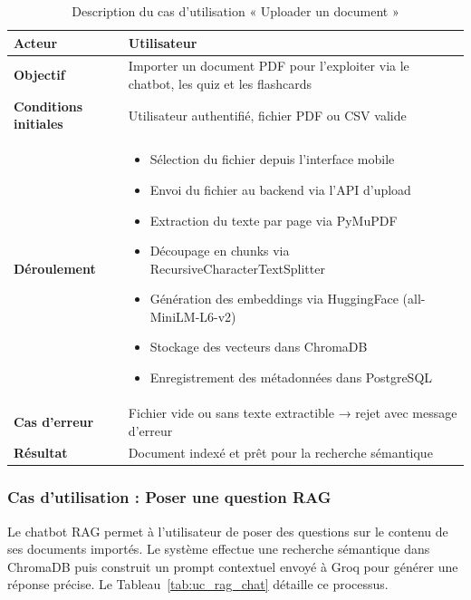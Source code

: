 \begin{table}[H]
\centering
\renewcommand{\arraystretch}{1.2}
\begin{tabular}{|p{4cm}|p{10cm}|}
\hline
\textbf{Acteur} & Utilisateur \\ \hline

\textbf{Objectif} & Importer un document PDF pour l'exploiter via le chatbot, les quiz et les flashcards \\ \hline

\textbf{Conditions initiales} & Utilisateur authentifié, fichier PDF ou CSV valide \\ \hline

\textbf{Déroulement} &
\begin{itemize}
    \item Sélection du fichier depuis l'interface mobile
    \item Envoi du fichier au backend via l'API d'upload
    \item Extraction du texte par page via PyMuPDF
    \item Découpage en chunks via RecursiveCharacterTextSplitter
    \item Génération des embeddings via HuggingFace (all-MiniLM-L6-v2)
    \item Stockage des vecteurs dans ChromaDB
    \item Enregistrement des métadonnées dans PostgreSQL
\end{itemize} \\ \hline

\textbf{Cas d'erreur} & Fichier vide ou sans texte extractible → rejet avec message d'erreur \\ \hline

\textbf{Résultat} & Document indexé et prêt pour la recherche sémantique \\ \hline
\end{tabular}
\caption{Description du cas d'utilisation « Uploader un document »}
\label{tab:uc_upload}
\end{table}

\subsubsection{Cas d'utilisation : Poser une question RAG}

Le chatbot RAG permet à l'utilisateur de poser des questions sur le contenu de ses documents importés. Le système effectue une recherche sémantique dans ChromaDB puis construit un prompt contextuel envoyé à Groq pour générer une réponse précise. Le Tableau~\ref{tab:uc_rag_chat} détaille ce processus.

